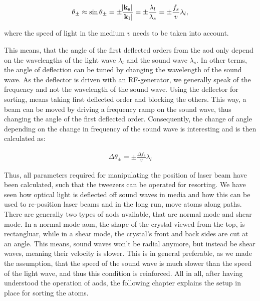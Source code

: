 \begin{figure}[tbp]
\end{figure}

\begin{align}
	\theta_\pm \approx \sin \theta_\pm = \pm \frac{\abs{\mathbf{k_s}}}{\abs{\mathbf{k_l}}} = \pm \frac{\lambda_l}{\lambda_s} = \pm \frac{f_s}{v} \lambda_l,
\end{align}

where the speed of light in the medium $v$ needs to be taken into account.

This means, that the angle of the first deflected orders from the \ac{aod} only depend on the wavelengths of the light wave $\lambda_l$ and the sound wave $\lambda_s$. In other terms, the angle of deflection can be tuned by changing the wavelength of the sound wave. As the deflector is driven with an RF-generator, we generally speak of the frequency and not the wavelength of the sound wave. Using the deflector for sorting, means taking first deflected order and blocking the others.
This way, a beam can be moved by driving a frequency ramp on the sound wave, thus changing the angle of the first deflected order. Consequently, the change of angle depending on the change in frequency of the sound wave is interesting and is then calculated as:

\begin{align}
	\Delta\theta_\pm = \pm \frac {\Delta f_s}{v} \lambda_l
\end{align}%
\label{eq:aod_angle}

Thus, all parameters required for manipulating the position of laser beam have been calculated, such that the tweezers can be operated for resorting. We have seen how optical light is deflected off sound waves in media and how this can be used to re-position laser beams and in the long run, move atoms along paths. There are generally two types of \acp{aod} available, that are normal mode and shear mode. In a normal mode \ac{aom}, the shape of the crystal viewed from the top, is rectangluar, while in a shear mode, the crystal's front and back sides are cut at an angle. This means, sound waves won't be radial anymore, but instead be shear waves, meaning their velocity is slower. This is in general preferable, as we made the assumption, that the speed of the sound wave is much slower than the speed of the light wave, and thus this condition is reinforced. All in all, after having understood the operation of \acp{aod}, the following chapter explains the setup in place for sorting the atoms.

